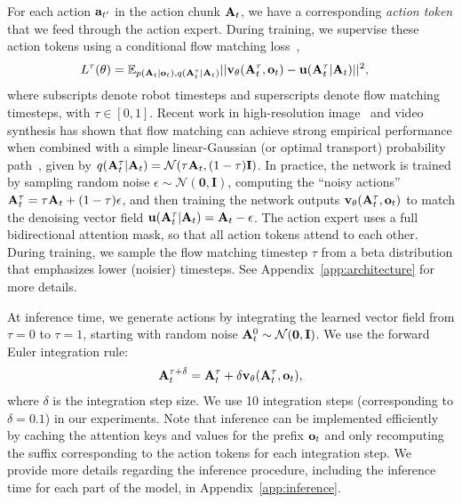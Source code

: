 For each action $\mathbf{a}_{t'}$ in the action chunk $\mathbf{A}_t$, we have a corresponding \emph{action token} that we feed through the action expert. During training, we supervise these action tokens using a conditional flow matching loss~\citep{lipman2022flow, liu2022rectified},
\begin{align*}
    L^\tau(\theta) &= \mathbb{E}_{p(\mathbf{A}_t | \mathbf{o}_t), q(\mathbf{A}_t^\tau | \mathbf{A}_t)} || \mathbf{v}_\theta(\mathbf{A}_t^\tau, \mathbf{o}_t) - \mathbf{u}(\mathbf{A}_t^\tau | \mathbf{A}_t) ||^2,
\end{align*}
where subscripts denote robot timesteps and superscripts denote flow matching timesteps, with $\tau \in [0, 1]$. Recent work in high-resolution image~\citep{esser2024scaling} and video~\citep{polyak2024movie} synthesis has shown that flow matching can achieve strong empirical performance when combined with a simple linear-Gaussian (or optimal transport) probability path~\citep{lipman2022flow}, given by \mbox{$q(\mathbf{A}_t^\tau | \mathbf{A}_t) = \mathcal{N}(\tau \mathbf{A}_t, (1 - \tau) \mathbf{I})$}. In practice, the network is trained by sampling random noise \mbox{$\epsilon \sim \mathcal{N}(\mathbf{0}, \mathbf{I})$}, computing the ``noisy actions'' \mbox{$\mathbf{A}_t^\tau = \tau \mathbf{A}_t + (1 - \tau) \epsilon$}, and then training the network outputs $\mathbf{v}_\theta(\mathbf{A}_t^\tau, \mathbf{o}_t)$ to match the denoising vector field $\mathbf{u}(\mathbf{A}_t^\tau | \mathbf{A}_t) = \mathbf{A}_t - \epsilon$. The action expert uses a full bidirectional attention mask, so that all action tokens attend to each other. During training, we sample the flow matching timestep $\tau$ from a beta distribution that emphasizes lower (noisier) timesteps. See Appendix~\ref{app:architecture} for more details.

At inference time, we generate actions by integrating the learned vector field from $\tau = 0$ to $\tau = 1$, starting with random noise $\mathbf{A}_t^0 \sim \mathcal{N}(\mathbf{0}, \mathbf{I})$. We use the forward Euler integration rule:
\begin{align*}
    \mathbf{A}_{t}^{\tau + \delta} = \mathbf{A}_{t}^{\tau} + \delta \mathbf{v}_\theta(\mathbf{A}_t^\tau, \mathbf{o}_t),
\end{align*}
where $\delta$ is the integration step size. We use 10 integration steps (corresponding to $\delta = 0.1$) in our experiments. Note that inference can be implemented efficiently by caching the attention keys and values for the prefix $\mathbf{o}_t$ and only recomputing the suffix corresponding to the action tokens for each integration step. We provide more details regarding the inference procedure, including the inference time for each part of the model, in Appendix~\ref{app:inference}.

